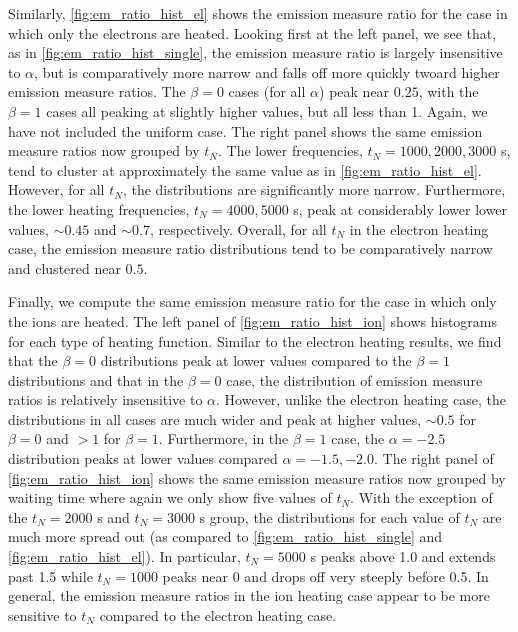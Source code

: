 \documentclass[preprint,linenumbers]{aastex}
\begin{document}
	\par Similarly, \autoref{fig:em_ratio_hist_el} shows the emission measure ratio for the case in which only the electrons are heated. Looking first at the left panel, we see that, as in \autoref{fig:em_ratio_hist_single}, the emission measure ratio is largely insensitive to $\alpha$, but is comparatively more narrow and falls off more quickly twoard higher emission measure ratios. The $\beta=0$ cases (for all $\alpha$) peak near $0.25$, with the $\beta=1$ cases all peaking at slightly higher values, but all less than 1. Again, we have not included the uniform case. The right panel shows the same emission measure ratios now grouped by $t_N$. The lower frequencies, $t_N=1000,2000,3000$ s, tend to cluster at approximately the same value as in \autoref{fig:em_ratio_hist_el}. However, for all $t_N$, the distributions are significantly more narrow. Furthermore, the lower heating frequencies, $t_N=4000,5000$ s, peak at considerably lower lower values, $\sim0.45$ and $\sim0.7$, respectively. Overall, for all $t_N$ in the electron heating case, the emission measure ratio distributions tend to be comparatively narrow and clustered near $0.5$.
	\par Finally, we compute the same emission measure ratio for the case in which only the ions are heated. The left panel of \autoref{fig:em_ratio_hist_ion} shows histograms for each type of heating function. Similar to the electron heating results, we find that the $\beta=0$ distributions peak at lower values compared to the $\beta=1$ distributions and that in the $\beta=0$ case, the distribution of emission measure ratios is relatively insensitive to $\alpha$. However, unlike the electron heating case, the distributions in all cases are much wider and peak at higher values, $\sim0.5$ for $\beta=0$ and $>1$ for $\beta=1$. Furthermore, in the $\beta=1$ case, the $\alpha=-2.5$ distribution peaks at lower values compared $\alpha=-1.5,-2.0$. The right panel of \autoref{fig:em_ratio_hist_ion} shows the same emission measure ratios now grouped by waiting time where again we only show five values of $t_N$. With the exception of the $t_N=2000$ s and $t_N=3000$ s group, the distributions for each value of $t_N$ are much more spread out (as compared to \autoref{fig:em_ratio_hist_single} and \autoref{fig:em_ratio_hist_el}). In particular, $t_N=5000$ s peaks above 1.0 and extends past 1.5 while $t_N=1000$ peaks near 0 and drops off very steeply before 0.5. In general, the emission measure ratios in the ion heating case appear to be more sensitive to $t_N$ compared to the electron heating case.
	\par{}
\end{document}
